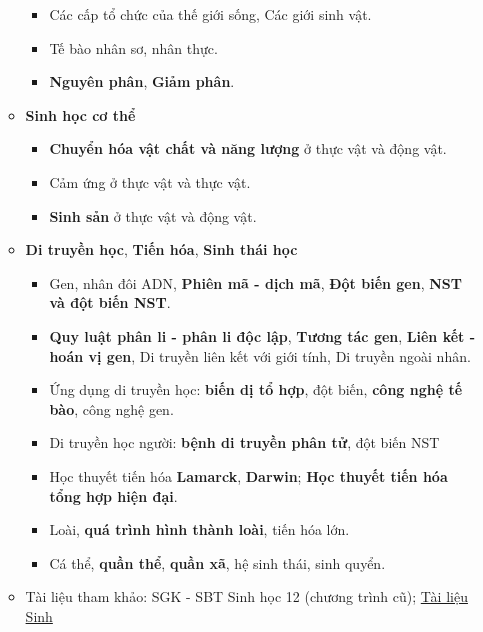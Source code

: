 \begin{enumerate}
\begin{itemize}
\begin{itemize}
            \item Các cấp tổ chức của thế giới sống, Các giới sinh vật.
            \item Tế bào nhân sơ, nhân thực.
            \item \textbf{Nguyên phân}, \textbf{Giảm phân}.
        \end{itemize}
        \item \textbf{Sinh học cơ thể}
        \begin{itemize}
            \item \textbf{Chuyển hóa vật chất và năng lượng} ở thực vật và động vật.
            \item Cảm ứng ở thực vật và thực vật.
            \item \textbf{Sinh sản} ở thực vật và động vật.
        \end{itemize}
        \item \textbf{Di truyền học}, \textbf{Tiến hóa}, \textbf{Sinh thái học}
        \begin{itemize}
            \item Gen, nhân đôi ADN, \textbf{Phiên mã - dịch mã}, \textbf{Đột biến gen}, \textbf{NST và đột biến NST}.
            \item \textbf{Quy luật phân li - phân li độc lập}, \textbf{Tương tác gen}, \textbf{Liên kết - hoán vị gen}, Di truyền liên kết với giới tính, Di truyền ngoài nhân.
            \item Ứng dụng di truyền học: \textbf{biến dị tổ hợp}, đột biến, \textbf{công nghệ tế bào}, công nghệ gen.
            \item Di truyền học người: \textbf{bệnh di truyền phân tử}, đột biến NST
            \item Học thuyết tiến hóa \textbf{Lamarck}, \textbf{Darwin}; \textbf{Học thuyết tiến hóa tổng hợp hiện đại}.
            \item Loài, \textbf{quá trình hình thành loài}, tiến hóa lớn.
            \item Cá thể, \textbf{quần thể}, \textbf{quần xã}, hệ sinh thái, sinh quyển.
        \end{itemize}
        \item Tài liệu tham khảo: SGK - SBT Sinh học 12 (chương trình cũ); \href{https://drive.google.com/drive/folders/1GWPNr640XLkQseoWNLUImwJnvmy5hh7h}{Tài liệu Sinh}
    \end{itemize}
\end{enumerate}

